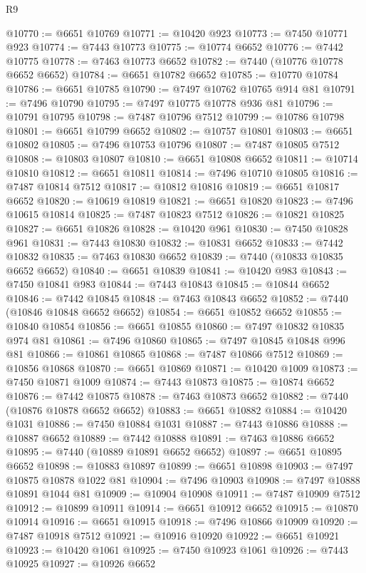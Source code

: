 \begin{lexlean}{R9}
\begin{coremodule}
@10770 := @6651 @10769
@10771 := @10420 @923
@10773 := @7450 @10771 @923
@10774 := @7443 @10773
@10775 := @10774 @6652
@10776 := @7442 @10775
@10778 := @7463 @10773 @6652
@10782 := @7440 (@10776 @10778 @6652 @6652)
@10784 := @6651 @10782 @6652
@10785 := @10770 @10784
@10786 := @6651 @10785
@10790 := @7497 @10762 @10765 @914 @81
@10791 := @7496 @10790
@10795 := @7497 @10775 @10778 @936 @81
@10796 := @10791 @10795
@10798 := @7487 @10796 @7512
@10799 := @10786 @10798
@10801 := @6651 @10799 @6652
@10802 := @10757 @10801
@10803 := @6651 @10802
@10805 := @7496 @10753 @10796
@10807 := @7487 @10805 @7512
@10808 := @10803 @10807
@10810 := @6651 @10808 @6652
@10811 := @10714 @10810
@10812 := @6651 @10811
@10814 := @7496 @10710 @10805
@10816 := @7487 @10814 @7512
@10817 := @10812 @10816
@10819 := @6651 @10817 @6652
@10820 := @10619 @10819
@10821 := @6651 @10820
@10823 := @7496 @10615 @10814
@10825 := @7487 @10823 @7512
@10826 := @10821 @10825
@10827 := @6651 @10826
@10828 := @10420 @961
@10830 := @7450 @10828 @961
@10831 := @7443 @10830
@10832 := @10831 @6652
@10833 := @7442 @10832
@10835 := @7463 @10830 @6652
@10839 := @7440 (@10833 @10835 @6652 @6652)
@10840 := @6651 @10839
@10841 := @10420 @983
@10843 := @7450 @10841 @983
@10844 := @7443 @10843
@10845 := @10844 @6652
@10846 := @7442 @10845
@10848 := @7463 @10843 @6652
@10852 := @7440 (@10846 @10848 @6652 @6652)
@10854 := @6651 @10852 @6652
@10855 := @10840 @10854
@10856 := @6651 @10855
@10860 := @7497 @10832 @10835 @974 @81
@10861 := @7496 @10860
@10865 := @7497 @10845 @10848 @996 @81
@10866 := @10861 @10865
@10868 := @7487 @10866 @7512
@10869 := @10856 @10868
@10870 := @6651 @10869
@10871 := @10420 @1009
@10873 := @7450 @10871 @1009
@10874 := @7443 @10873
@10875 := @10874 @6652
@10876 := @7442 @10875
@10878 := @7463 @10873 @6652
@10882 := @7440 (@10876 @10878 @6652 @6652)
@10883 := @6651 @10882
@10884 := @10420 @1031
@10886 := @7450 @10884 @1031
@10887 := @7443 @10886
@10888 := @10887 @6652
@10889 := @7442 @10888
@10891 := @7463 @10886 @6652
@10895 := @7440 (@10889 @10891 @6652 @6652)
@10897 := @6651 @10895 @6652
@10898 := @10883 @10897
@10899 := @6651 @10898
@10903 := @7497 @10875 @10878 @1022 @81
@10904 := @7496 @10903
@10908 := @7497 @10888 @10891 @1044 @81
@10909 := @10904 @10908
@10911 := @7487 @10909 @7512
@10912 := @10899 @10911
@10914 := @6651 @10912 @6652
@10915 := @10870 @10914
@10916 := @6651 @10915
@10918 := @7496 @10866 @10909
@10920 := @7487 @10918 @7512
@10921 := @10916 @10920
@10922 := @6651 @10921
@10923 := @10420 @1061
@10925 := @7450 @10923 @1061
@10926 := @7443 @10925
@10927 := @10926 @6652

\end{coremodule}
\end{lexlean}
